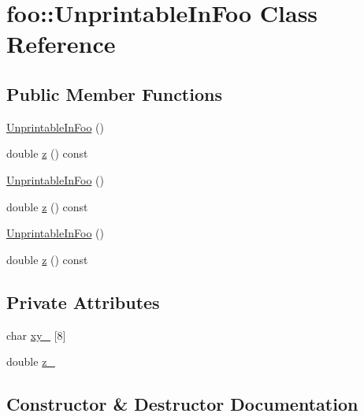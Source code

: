 \hypertarget{classfoo_1_1_unprintable_in_foo}{}\section{foo\+::Unprintable\+In\+Foo Class Reference}
\label{classfoo_1_1_unprintable_in_foo}
\subsection*{Public Member Functions}
\begin{DoxyCompactItemize}
\item 
\mbox{\hyperlink{classfoo_1_1_unprintable_in_foo_a120cd61575729a26a96690c8a58e41f8}{Unprintable\+In\+Foo}} ()
\item 
double \mbox{\hyperlink{classfoo_1_1_unprintable_in_foo_a3dc8c8e90906bb6f3376474d545e488c}{z}} () const
\item 
\mbox{\hyperlink{classfoo_1_1_unprintable_in_foo_a120cd61575729a26a96690c8a58e41f8}{Unprintable\+In\+Foo}} ()
\item 
double \mbox{\hyperlink{classfoo_1_1_unprintable_in_foo_a3dc8c8e90906bb6f3376474d545e488c}{z}} () const
\item 
\mbox{\hyperlink{classfoo_1_1_unprintable_in_foo_a120cd61575729a26a96690c8a58e41f8}{Unprintable\+In\+Foo}} ()
\item 
double \mbox{\hyperlink{classfoo_1_1_unprintable_in_foo_a3dc8c8e90906bb6f3376474d545e488c}{z}} () const
\end{DoxyCompactItemize}
\subsection*{Private Attributes}
\begin{DoxyCompactItemize}
\item 
char \mbox{\hyperlink{classfoo_1_1_unprintable_in_foo_a384844cba2972090c627810356e20efc}{xy\+\_\+}} \mbox{[}8\mbox{]}
\item 
double \mbox{\hyperlink{classfoo_1_1_unprintable_in_foo_a48136583cf853dcb112f46d33eb7b8eb}{z\+\_\+}}
\end{DoxyCompactItemize}


\subsection{Constructor \& Destructor Documentation}
\mbox{\label{classfoo_1_1_unprintable_in_foo_a120cd61575729a26a96690c8a58e41f8}} 
